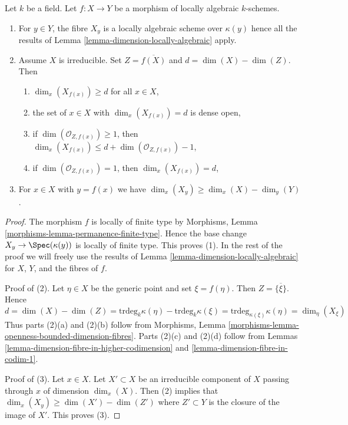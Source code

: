 \begin{lemma}
\label{lemma-dimension-fibres-locally-algebraic}
Let $k$ be a field. Let $f : X \to Y$ be a morphism of locally algebraic
$k$-schemes.
\begin{enumerate}
\item For $y \in Y$, the fibre $X_y$ is a locally
algebraic scheme over $\kappa(y)$ hence all the results of
Lemma \ref{lemma-dimension-locally-algebraic} apply.
\item Assume $X$ is irreducible. Set $Z = \overline{f(X)}$ and
$d = \dim(X) - \dim(Z)$. Then
\begin{enumerate}
\item $\dim_x(X_{f(x)}) \geq d$ for all $x \in X$,
\item the set of $x \in X$ with $\dim_x(X_{f(x)}) = d$ is dense open,
\item if $\dim(\mathcal{O}_{Z, f(x)}) \geq 1$, then
$\dim_x(X_{f(x)}) \leq d + \dim(\mathcal{O}_{Z, f(x)}) - 1$,
\item if $\dim(\mathcal{O}_{Z, f(x)}) = 1$, then $\dim_x(X_{f(x)}) = d$,
\end{enumerate}
\item For $x \in X$ with $y = f(x)$ we have
$\dim_x(X_y) \geq \dim_x(X) - \dim_y(Y)$.
\end{enumerate}
\end{lemma}

\begin{proof}
The morphism $f$ is locally of finite type by
Morphisms, Lemma \ref{morphisms-lemma-permanence-finite-type}.
Hence the base change $X_y \to \Spec(\kappa(y))$ is locally
of finite type. This proves (1).
In the rest of the proof we will freely use the results
of Lemma \ref{lemma-dimension-locally-algebraic} for $X$, $Y$, and
the fibres of $f$.

\medskip\noindent
Proof of (2). Let $\eta \in X$ be the generic point and set
$\xi = f(\eta)$. Then $Z = \overline{\{\xi\}}$. Hence
$$
d = \dim(X) - \dim(Z) =
\text{trdeg}_k \kappa(\eta) - \text{trdeg}_k \kappa(\xi) =
\text{trdeg}_{\kappa(\xi)} \kappa(\eta) = \dim_\eta(X_\xi)
$$
Thus parts (2)(a) and (2)(b) follow from
Morphisms, Lemma \ref{morphisms-lemma-openness-bounded-dimension-fibres}.
Parts (2)(c) and (2)(d) follow from
Lemmas \ref{lemma-dimension-fibre-in-higher-codimension} and
\ref{lemma-dimension-fibre-in-codim-1}.

\medskip\noindent
Proof of (3). Let $x \in X$. Let $X' \subset X$ be an irreducible component
of $X$ passing through $x$ of dimension $\dim_x(X)$. Then (2) implies that
$\dim_x(X_y) \geq \dim(X') - \dim(Z')$ where $Z' \subset Y$
is the closure of the image of $X'$. This proves (3).
\end{proof}


